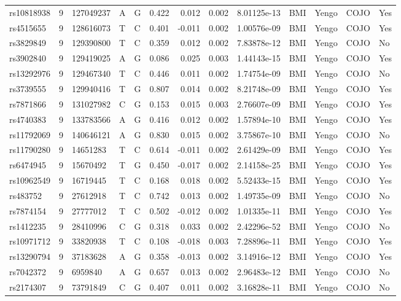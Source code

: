 \documentclass[11pt,twoside]{bristolthesis}
\begin{document}
\begin{longtable}[t]{lrlllrrrlllll}
\addlinespace
rs10818938 & 9 & 127049237 & A & G & 0.422 & 0.012 & 0.002 & 8.01125e-13 & BMI & Yengo & COJO & Yes\\
rs4515655 & 9 & 128616073 & T & C & 0.401 & -0.011 & 0.002 & 1.00576e-09 & BMI & Yengo & COJO & Yes\\
rs3829849 & 9 & 129390800 & T & C & 0.359 & 0.012 & 0.002 & 7.83878e-12 & BMI & Yengo & COJO & No\\
rs3902840 & 9 & 129419025 & A & G & 0.086 & 0.025 & 0.003 & 1.44143e-15 & BMI & Yengo & COJO & Yes\\
rs13292976 & 9 & 129467340 & T & C & 0.446 & 0.011 & 0.002 & 1.74754e-09 & BMI & Yengo & COJO & No\\
\addlinespace
rs3739555 & 9 & 129940416 & T & G & 0.807 & 0.014 & 0.002 & 8.21748e-09 & BMI & Yengo & COJO & Yes\\
rs7871866 & 9 & 131027982 & C & G & 0.153 & 0.015 & 0.003 & 2.76607e-09 & BMI & Yengo & COJO & Yes\\
rs4740383 & 9 & 133783566 & A & G & 0.416 & 0.012 & 0.002 & 1.57894e-10 & BMI & Yengo & COJO & Yes\\
rs11792069 & 9 & 140646121 & A & G & 0.830 & 0.015 & 0.002 & 3.75867e-10 & BMI & Yengo & COJO & No\\
rs11790280 & 9 & 14651283 & T & C & 0.614 & -0.011 & 0.002 & 2.61429e-09 & BMI & Yengo & COJO & Yes\\
\addlinespace
rs6474945 & 9 & 15670492 & T & G & 0.450 & -0.017 & 0.002 & 2.14158e-25 & BMI & Yengo & COJO & Yes\\
rs10962549 & 9 & 16719445 & T & C & 0.168 & 0.018 & 0.002 & 5.52433e-15 & BMI & Yengo & COJO & Yes\\
rs483752 & 9 & 27612918 & T & C & 0.742 & 0.013 & 0.002 & 1.49735e-09 & BMI & Yengo & COJO & No\\
rs7874154 & 9 & 27777012 & T & C & 0.502 & -0.012 & 0.002 & 1.01335e-11 & BMI & Yengo & COJO & Yes\\
rs1412235 & 9 & 28410996 & C & G & 0.318 & 0.033 & 0.002 & 2.42296e-52 & BMI & Yengo & COJO & No\\
\addlinespace
rs10971712 & 9 & 33820938 & T & C & 0.108 & -0.018 & 0.003 & 7.28896e-11 & BMI & Yengo & COJO & Yes\\
rs13290794 & 9 & 37183628 & A & G & 0.358 & -0.013 & 0.002 & 3.14916e-12 & BMI & Yengo & COJO & Yes\\
rs7042372 & 9 & 6959840 & A & G & 0.657 & 0.013 & 0.002 & 2.96483e-12 & BMI & Yengo & COJO & No\\
rs2174307 & 9 & 73791849 & C & G & 0.407 & 0.011 & 0.002 & 3.16828e-11 & BMI & Yengo & COJO & No\\

\end{longtable}
\end{document}
